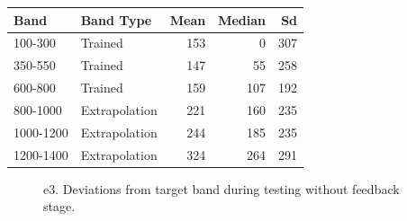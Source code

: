 \documentclass[
  letterpaper,
  DIV=11,
  numbers=noendperiod,
  oneside]{scrartcl}
\begin{document}
\begin{table}
{\begin{tabular}[t]{l|l|r|r|r}
\hline
Band & Band Type & Mean & Median & Sd\\
\hline
100-300 & Trained & 153 & 0 & 307\\
\hline
350-550 & Trained & 147 & 55 & 258\\
\hline
600-800 & Trained & 159 & 107 & 192\\
\hline
800-1000 & Extrapolation & 221 & 160 & 235\\
\hline
1000-1200 & Extrapolation & 244 & 185 & 235\\
\hline
1200-1400 & Extrapolation & 324 & 264 & 291\\
\hline
\end{tabular}

}

\end{table}%

\begin{figure}


\caption{\label{fig-e3-test-dev}e3. Deviations from target band during
testing without feedback stage.}

\end{figure}%

\begin{table}

\caption{\label{tbl-e3-bmm-dist}Experiment 3. Bayesian Mixed Model
predicting absolute deviation as a function of condition (Constant
vs.~Varied) and Velocity Band}


\end{table}%
\end{document}
